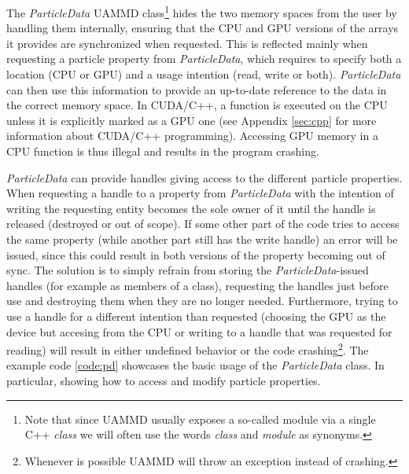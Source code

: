 \documentclass[twoside,openright,titlepage,numbers=noenddot,%
headinclude,footinclude,cleardoublepage=empty,abstract=on,
BCOR=5mm,fontsize=11pt, dvipsnames, paper=b5
]{scrreprt}
\newcommand{\uammd}{\gls{UAMMD}\xspace}
\newcommand{\gpu}{\gls{GPU}\xspace}
\begin{document}
The \emph{ParticleData} \uammd class\footnote{Note that since \uammd usually exposes a so-called module via a single C++ \emph{class} we will often use the words \emph{class} and \emph{module} as synonyms.} hides the two memory spaces from the user by handling them internally, ensuring that the CPU and \gpu versions of the arrays it provides are synchronized when requested. This is reflected mainly when requesting a particle property from \emph{ParticleData}, which requires to specify both a location (CPU or \gpu) and a usage intention (read, write or both). \emph{ParticleData} can then use this information to provide an up-to-date reference to the data in the correct memory space.
In CUDA/C++, a function is executed on the CPU unless it is explicitly marked as a \gpu one (see Appendix \ref{sec:cpp} for more information about CUDA/C++ programming). Accessing \gpu memory in a CPU function is thus illegal and results in the program crashing.

\emph{ParticleData} can provide handles giving access to the different particle properties.
When requesting a handle to a property from \emph{ParticleData} with the intention of writing the requesting entity becomes the sole owner of it until the handle is released (destroyed or out of scope). If some other part of the code tries to access the same property (while another part still has the write handle) an error will be issued, since this could result in both versions of the property becoming out of sync. The solution is to simply refrain from storing the \emph{ParticleData}-issued handles (for example as members of a class), requesting the handles just before use and destroying them when they are no longer needed. Furthermore, trying to use a handle for a different intention than requested (choosing the GPU as the device but accesing from the CPU or writing to a handle that was requested for reading) will result in either undefined behavior or the code crashing\footnote{Whenever is possible \uammd will throw an exception instead of crashing.}. The example code \ref{code:pd} showcases the basic usage of the \emph{ParticleData} class. In particular, showing how to access and modify particle properties.
\end{document}
